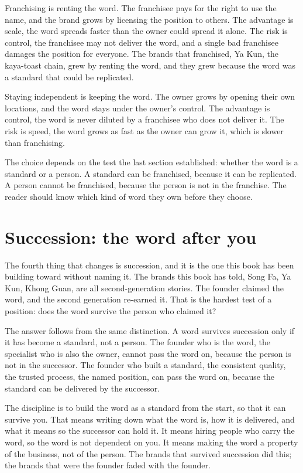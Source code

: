 \documentclass[10pt,twoside,openany]{memoir}
\newcommand{\needspacehead}{\needspace{4\baselineskip}}
\let\oldsection\section
\renewcommand{\section}{\needspacehead\oldsection}
\begin{document}
{{Franchising is renting the word. The franchisee pays for the right to
use the name, and the brand grows by licensing the position to others.
The advantage is scale, the word spreads faster than the owner could
spread it alone. The risk is control, the franchisee may not deliver the
word, and a single bad franchisee damages the position for everyone. The
brands that franchised, Ya Kun, the kaya-toast chain, grew by renting
the word, and they grew because the word was a standard that could be
replicated.

Staying independent is keeping the word. The owner grows by opening
their own locations, and the word stays under the owner's control. The
advantage is control, the word is never diluted by a franchisee who does
not deliver it. The risk is speed, the word grows as fast as the owner
can grow it, which is slower than franchising.

The choice depends on the test the last section established: whether the
word is a standard or a person. A standard can be franchised, because it
can be replicated. A person cannot be franchised, because the person is
not in the franchise. The reader should know which kind of word they own
before they choose.

\section{Succession: the word after
you}\label{succession-the-word-after-you}

The fourth thing that changes is succession, and it is the one this book
has been building toward without naming it. The brands this book has
told, Song Fa, Ya Kun, Khong Guan, are all second-generation stories.
The founder claimed the word, and the second generation re-earned it.
That is the hardest test of a position: does the word survive the person
who claimed it?

The answer follows from the same distinction. A word survives succession
only if it has become a standard, not a person. The founder who is the
word, the specialist who is also the owner, cannot pass the word on,
because the person is not in the successor. The founder who built a
standard, the consistent quality, the trusted process, the named
position, can pass the word on, because the standard can be delivered by
the successor.

The discipline is to build the word as a standard from the start, so
that it can survive you. That means writing down what the word is, how
it is delivered, and what it means so the successor can hold it. It
means hiring people who carry the word, so the word is not dependent on
you. It means making the word a property of the business, not of the
person. The brands that survived succession did this; the brands that
were the founder faded with the founder.

}}
\end{document}
